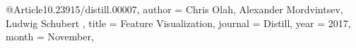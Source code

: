 @Article{10.23915/distill.00007,
	author = {Chris Olah, Alexander Mordvintsev, Ludwig Schubert
	},
	title = {Feature Visualization},
	journal = {Distill},
	year = {2017},
	month = {November},
}
